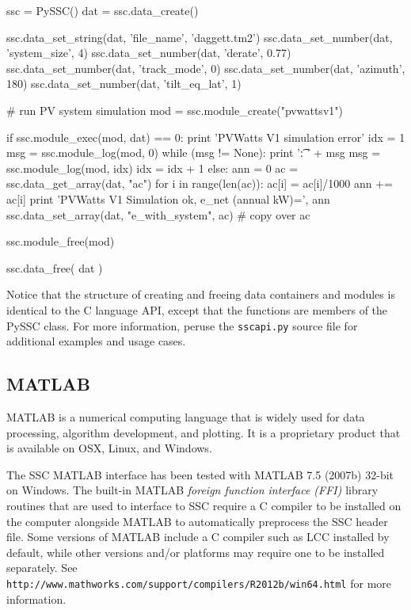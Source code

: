\documentclass{article}
\begin{document}
\begin{verbatimtab}[4]
	ssc = PySSC()
	dat = ssc.data_create()

	ssc.data_set_string(dat, 'file_name', 'daggett.tm2')
	ssc.data_set_number(dat, 'system_size', 4)
	ssc.data_set_number(dat, 'derate', 0.77)
	ssc.data_set_number(dat, 'track_mode', 0)
	ssc.data_set_number(dat, 'azimuth', 180)
	ssc.data_set_number(dat, 'tilt_eq_lat', 1)

	# run PV system simulation
	mod = ssc.module_create("pvwattsv1")

	if ssc.module_exec(mod, dat) == 0:
		print 'PVWatts V1 simulation error'
		idx = 1
		msg = ssc.module_log(mod, 0)
		while (msg != None):
			print '\t: ' + msg
			msg = ssc.module_log(mod, idx)
			idx = idx + 1
	else:
		ann = 0
		ac = ssc.data_get_array(dat, "ac")
		for i in range(len(ac)):
			ac[i] = ac[i]/1000
			ann += ac[i]
		print 'PVWatts V1 Simulation ok, e_net (annual kW)=', ann
		ssc.data_set_array(dat, "e_with_system", ac) # copy over ac

	ssc.module_free(mod)

	ssc.data_free( dat )
\end{verbatimtab}

Notice that the structure of creating and freeing data containers and modules is identical to the C language API, except that the functions are members of the PySSC class.  For more information, peruse the \texttt{sscapi.py} source file for additional examples and usage cases.

\subsection{MATLAB}

MATLAB is a numerical computing language that is widely used for data processing, algorithm development, and plotting.  It is a proprietary product that is available on OSX, Linux, and Windows.  

The SSC MATLAB interface has been tested with MATLAB 7.5 (2007b) 32-bit on Windows.  The built-in MATLAB \emph{foreign function interface (FFI)} library routines that are used to interface to SSC require a C compiler to be installed on the computer alongside MATLAB to automatically preprocess the SSC header file.  Some versions of MATLAB include a C compiler such as LCC installed by default, while other versions and/or platforms may require one to be installed separately.  See \texttt{http://www.mathworks.com/support/compilers/R2012b/win64.html} for more information.
\end{document}
